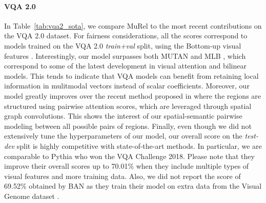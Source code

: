 \documentclass[10pt,twocolumn,letterpaper]{article}
\begin{document}
\paragraph{VQA 2.0}
In Table~\ref{tab:vqa2_sota}, we compare MuRel to the most recent contributions on the VQA 2.0 dataset. For fairness considerations, all the scores correspond to models trained on the VQA 2.0 \textit{train+val} split, using the Bottom-up visual features \cite{Anderson_2018_CVPR}. 
Interestingly, our model surpasses both MUTAN \cite{benyounescadene2017mutan} and MLB \cite{Kim2017}, which correspond to some of the latest development in visual attention and bilinear models. This tends to indicate that VQA models can benefit from retaining local information in mulitmodal vectors instead of scalar coefficients. 
Moreover, our model greatly improves over the recent method proposed in \cite{learningconditionedgraph} where the regions are structured using pairwise attention scores, which are leveraged through spatial graph convolutions. This shows the interest of our spatial-semantic pairwise modeling between all possible pairs of regions.
Finally, even though we did not extensively tune the hyperparameters of our model, our overall score on the \textit{test-dev} split is highly competitive with state-of-the-art methods. In particular, we are comparable to Pythia \cite{pythia18arxiv} who won the VQA Challenge 2018. Please note that they improve their overall scores up to 70.01\% when they include multiple types of visual features and more training data. Also, we did not report the score of 69.52\% obtained by BAN \cite{Kim2018} as they train their model on extra data from the Visual Genome dataset \cite{Krishna_2017_IJCV}.
\end{document}
